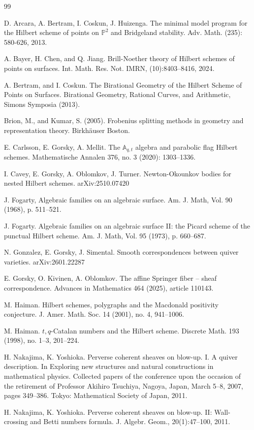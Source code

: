 \documentclass[12pt]{amsart}
\numberwithin{equation}{section}
\theoremstyle{definition}
\begin{document}
\begin{thebibliography}{99}

 D. Arcara, A. Bertram, I. Coskun, J. Huizenga. The minimal model program for the Hilbert scheme of points on $\mathbb{P}^2$ and Bridgeland stability. Adv. Math. (235): 580-626, 2013.

 A. Bayer, H. Chen, and Q. Jiang. Brill-Noether theory of Hilbert schemes of points on surfaces. Int.
Math. Res. Not. IMRN, (10):8403--8416, 2024.

 A. Bertram, and I. Coskun. The Birational Geometry of the Hilbert Scheme of Points on Surfaces. Birational Geometry, Rational Curves, and Arithmetic, Simons Symposia (2013).



 Brion, M., and  Kumar, S. (2005). Frobenius splitting methods in
  geometry and representation theory.  Birkhäuser Boston.

  
 E. Carlsson, E. Gorsky, A. Mellit. The 
$\mathbb{A}_{q,t}$ algebra and parabolic flag Hilbert schemes. Mathematische Annalen 376, no. 3 (2020): 1303--1336.

 I. Cavey, E. Gorsky, A. Oblomkov, J. Turner. Newton-Okounkov bodies for nested Hilbert schemes. arXiv:2510.07420

 J. Fogarty, Algebraic families on an algebraic surface. Am. J. Math, Vol. 90
(1968), p. 511--521.

 J. Fogarty. Algebraic families on an algebraic surface II: the Picard scheme
of the punctual Hilbert scheme. Am. J. Math, Vol. 95 (1973), p. 660--687.

 N. Gonzalez, E. Gorsky, J. Simental. Smooth correspondences between quiver varieties. arXiv:2601.22287

  E. Gorsky, O. Kivinen, A. Oblomkov. The affine Springer fiber -- sheaf correspondence.
Advances in Mathematics 464 (2025), article 110143.

 M. Haiman. Hilbert schemes, polygraphs and the Macdonald positivity conjecture.
J. Amer. Math. Soc. 14 (2001), no. 4, 941--1006.

   M. Haiman. $t,q$-Catalan numbers and the Hilbert scheme.
Discrete Math. 193 (1998), no. 1--3, 201--224.

 H. Nakajima, K. Yoshioka. Perverse coherent sheaves on blow-up. I. A quiver description. In Exploring new
structures and natural constructions in mathematical physics. Collected papers of the conference upon the occasion of
the retirement of Professor Akihiro Tsuchiya, Nagoya, Japan, March 5--8, 2007, pages 349--386. Tokyo: Mathematical
Society of Japan, 2011.

 H. Nakajima, K. Yoshioka. Perverse coherent sheaves on blow-up. II: Wall-crossing and Betti numbers
formula. J. Algebr. Geom., 20(1):47--100, 2011.



\end{thebibliography}
\end{document}
